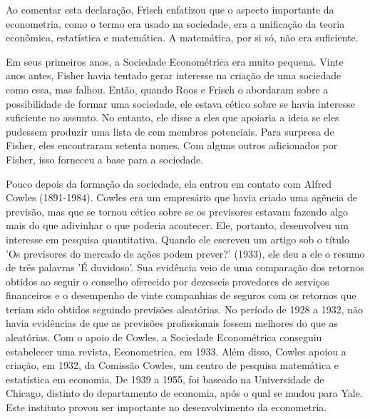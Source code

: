 \documentclass[12pt]{article}
\begin{document}
Ao comentar esta declaração, Frisch enfatizou que o aspecto importante da econometria, como o termo era usado na sociedade, era a unificação da teoria econômica, estatística e matemática. A matemática, por si só, não era suficiente.

Em seus primeiros anos, a Sociedade Econométrica era muito pequena. Vinte anos antes, Fisher havia tentado gerar interesse na criação de uma sociedade como essa, mas falhou. Então, quando Roos e Frisch o abordaram sobre a possibilidade de formar uma sociedade, ele estava cético sobre se havia interesse suficiente no assunto. No entanto, ele disse a eles que apoiaria a ideia se eles pudessem produzir uma lista de cem membros potenciais. Para surpresa de Fisher, eles encontraram setenta nomes. Com alguns outros adicionados por Fisher, isso forneceu a base para a sociedade.

Pouco depois da formação da sociedade, ela entrou em contato com Alfred Cowles (1891-1984). Cowles era um empresário que havia criado uma agência de previsão, mas que se tornou cético sobre se os previsores estavam fazendo algo mais do que adivinhar o que poderia acontecer. Ele, portanto, desenvolveu um interesse em pesquisa quantitativa. Quando ele escreveu um artigo sob o título 'Os previsores do mercado de ações podem prever?' (1933), ele deu a ele o resumo de três palavras 'É duvidoso'. Sua evidência veio de uma comparação dos retornos obtidos ao seguir o conselho oferecido por dezesseis provedores de serviços financeiros e o desempenho de vinte companhias de seguros com os retornos que teriam sido obtidos seguindo previsões aleatórias. No período de 1928 a 1932, não havia evidências de que as previsões profissionais fossem melhores do que as aleatórias. Com o apoio de Cowles, a Sociedade Econométrica conseguiu estabelecer uma revista, Econometrica, em 1933. Além disso, Cowles apoiou a criação, em 1932, da Comissão Cowles, um centro de pesquisa matemática e estatística em economia. De 1939 a 1955, foi baseado na Universidade de Chicago, distinto do departamento de economia, após o qual se mudou para Yale. Este instituto provou ser importante no desenvolvimento da econometria.
\end{document}
